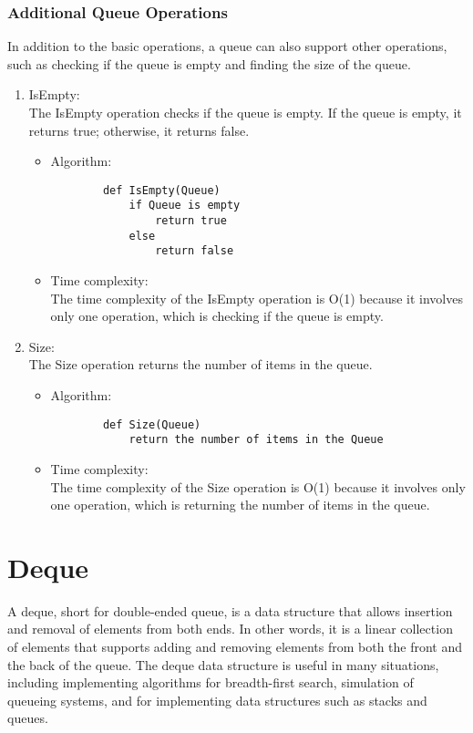 \documentclass[a4paper, 11pt, oneside]{book} %
\begin{document}
\subsubsection{Additional Queue Operations}
In addition to the basic operations, a queue can also support other operations, such as checking if the queue is empty and finding the size of the queue.
\begin{enumerate}
    \item IsEmpty:
    \\
    The IsEmpty operation checks if the queue is empty. If the queue is empty, it returns true; otherwise, it returns false.
    \begin{itemize}
    \item Algorithm:
    \\
    \begin{lstlisting}
        def IsEmpty(Queue)
            if Queue is empty
                return true
            else
                return false
    \end{lstlisting}    
    \item Time complexity:
    \\
    The time complexity of the IsEmpty operation is O(1) because it involves only one operation, which is checking if the queue is empty.
    \end{itemize}

    \item Size:
    \\
    The Size operation returns the number of items in the queue.
    \begin{itemize}
    \item Algorithm:
    \\
    \begin{lstlisting}
        def Size(Queue)
            return the number of items in the Queue
    \end{lstlisting}    
    \item Time complexity:
    \\
    The time complexity of the Size operation is O(1) because it involves only one operation, which is returning the number of items in the queue.
    \end{itemize}
\end{enumerate}

\section{Deque}
A deque, short for double-ended queue, is a data structure that allows insertion and removal of elements from both ends. In other words, it is a linear collection of elements that supports adding and removing elements from both the front and the back of the queue. The deque data structure is useful in many situations, including implementing algorithms for breadth-first search, simulation of queueing systems, and for implementing data structures such as stacks and queues.
\end{document}
